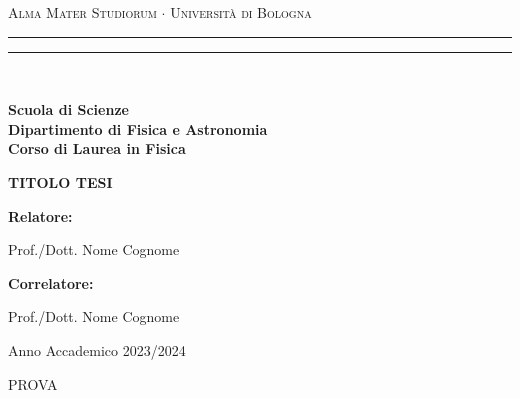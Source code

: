 \documentclass[12pt,a4paper,twoside]{report}
\newenvironment{dedication}{
	\clearpage           %
	\thispagestyle{empty}%
	\vspace*{\stretch{1}}%
	\itshape             %
	\raggedleft          %
}
{\par %
	\vspace{\stretch{3}} %
	\clearpage           %
}
\begin{document}
	\begin{titlepage}
		\begin{center}
			{{\Large{\textsc{Alma Mater Studiorum $\cdot$ Universit\`a di Bologna}}}} 
			\rule[0.1cm]{15.8cm}{0.1mm}
			\rule[0.5cm]{15.8cm}{0.6mm}
			\\\vspace{3mm}
			
			{\small{\bf Scuola di Scienze \\ 
					Dipartimento di Fisica e Astronomia\\
					Corso di Laurea in Fisica}}
			
		\end{center}
		
		\vspace{23mm}
		
		\begin{center}
			{\LARGE{\bf TITOLO TESI}}\\
		\end{center}
		
		\vspace{50mm} \par \noindent
		
		\begin{minipage}[t]{0.47\textwidth}
			{\large{\bf Relatore: \vspace{2mm}
					
					Prof./Dott. Nome Cognome}}
		\end{minipage}
		\hfill
		\begin{minipage}[t]{0.47\textwidth}
		\end{minipage}
		
		\par
		\vspace{\baselineskip}
		
		\begin{minipage}[t]{0.47\textwidth}
			{\large{\bf Correlatore: \vspace{2mm}
					
					Prof./Dott. Nome Cognome}}
		\end{minipage}
		
		\vspace{45mm}
		
		\begin{center}
			Anno Accademico { 2023/2024}
		\end{center}
		
	\end{titlepage}
	\newpage
	\onehalfspacing %
	\begin{dedication}
		PROVA
	\end{dedication}
\end{document}
